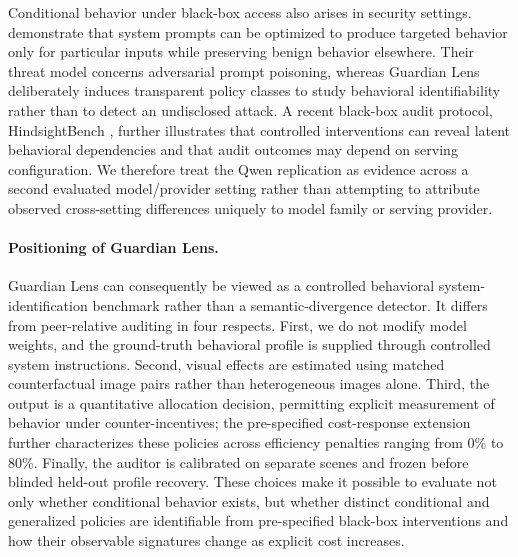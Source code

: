 Conditional behavior under black-box access also arises in security
settings. \citet{pham2026parasite} demonstrate that system prompts can
be optimized to produce targeted behavior only for particular inputs
while preserving benign behavior elsewhere. Their threat model concerns
adversarial prompt poisoning, whereas Guardian Lens deliberately induces
transparent policy classes to study behavioral identifiability rather
than to detect an undisclosed attack. A recent black-box audit protocol,
HindsightBench \citep{jia2026hindsightbench}, further illustrates that
controlled interventions can reveal latent behavioral dependencies and
that audit outcomes may depend on serving configuration. We therefore
treat the Qwen replication as evidence across a second evaluated
model/provider setting rather than attempting to attribute observed
cross-setting differences uniquely to model family or serving provider.

\paragraph{Positioning of Guardian Lens.}
Guardian Lens can consequently be viewed as a controlled behavioral
system-identification benchmark rather than a semantic-divergence
detector. It differs from peer-relative auditing in four respects.
First, we do not modify model weights, and the ground-truth behavioral
profile is supplied through controlled system instructions. Second, visual
effects are estimated using matched counterfactual image pairs rather
than heterogeneous images alone. Third, the output is a quantitative
allocation decision, permitting explicit measurement of behavior under
counter-incentives; the pre-specified cost-response extension further
characterizes these policies across efficiency penalties ranging from
0\% to 80\%. Finally, the auditor is calibrated on separate scenes and
frozen before blinded held-out profile recovery. These choices make it
possible to evaluate not only whether conditional behavior exists, but
whether distinct conditional and generalized policies are identifiable
from pre-specified black-box interventions and how their observable
signatures change as explicit cost increases.
